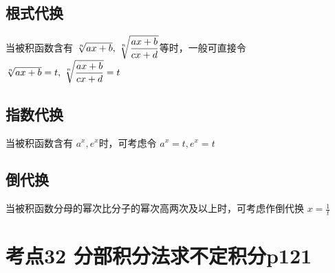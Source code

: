 \subsection{根式代换}

当被积函数含有 $\sqrt[n]{ax+b},\displaystyle\hspace{.2em}\sqrt[n]{\frac{ax+b}{cx+d}}$等时，一般可直接令 $\sqrt[n]{ax+b}=t,\displaystyle\hspace{.2em}\sqrt[n]{\frac{ax+b}{cx+d}}=t$

\subsection{指数代换}

当被积函数含有 $a^x,e^x$时，可考虑令 $a^x=t,e^x=t$

\subsection{倒代换}

当被积函数分母的幂次比分子的幂次高两次及以上时，可考虑作倒代换 $x=\frac{1}{t}$

\section{考点32 分部积分法求不定积分p121}

